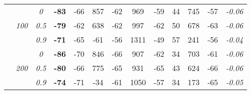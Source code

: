 \begin{table}
\begin{center}
\begin{tabular}{ccc|cc|cc|cc|cc|c|c}
\cline{2-3}\rule{0pt}{3ex}
& & \it  0  & {\bf -83} & -66 & 857 & -62 & 969 & -59 & 44 & 745 & -57 & \it  -0.06 \\
 & \it  100  & \it  0.5  & {\bf -79} & -62 & 638 & -62 & 997 & -62 & 50 & 678 & -63 & \it  -0.06 \\
& & \it  0.9  & {\bf -71} & -65 & -61 & -56 & 1311 & -49 & 57 & 241 & -56 & \it  -0.04 \\[1ex]
\cline{2-3}\rule{0pt}{3ex}
& & \it  0  & {\bf -86} & -70 & 846 & -66 & 907 & -62 & 34 & 703 & -61 & \it  -0.06 \\
 & \it  200  & \it  0.5  & {\bf -80} & -66 & 775 & -65 & 931 & -65 & 43 & 624 & -66 & \it  -0.06 \\
& & \it  0.9  & {\bf -74} & -71 & -34 & -61 & 1050 & -57 & 34 & 173 & -65 & \it  -0.05 \\
\hline\end{tabular}
\end{center}
\end{table}




